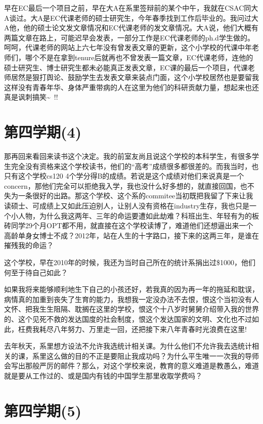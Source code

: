 \documentclass[12pt]{book}
\begin{document}
早在EC最后一个项目之前，早在大A在系里签辩前的某个中午，我就在CSAC同大A谈过。大A是EC代课老师的硕士研究生，今年春季找到工作后毕业的。我问过大A他，他的硕士论文发文章情况和EC代课老师的发文章情况。大A说，他们大概有两篇文章在路上，可能迟早会发表，一部分工作是EC代课老师的ph.d学生做的。呵呵，代课老师的网站上六七年没有曾发表文章的更新，这个小学校的代课中年老师们，哪个不是在拿到tenure后就再也不曾发表一篇文章，EC代课老师，连他的硕士研究生、博士研究生都未必能真正发表文章，EC课的最后一个项目，代课老师居然是狠打舆论、鼓励学生去发表文章来装点门面，这个小学校居然也是要留我这样没有青春年华、身体严重带病的人在这里为他们的科研贡献力量，想起来也还真是讽刺搞笑\textasciitilde{}~!!

\section{第四学期(4)}
\label{sec-45-4}

那再回来看回来读书这个决定。我的前室友尚且说这个学校的本科学生，有很多学生完全没有资格来这个学校读书，他们的“高考”成绩很多都很差的。而我当时，也只有这个学校cs120 4个学分得B的成绩。若说是这个成绩对他们来说真是一个concern，那他们完全可以拒绝我入学，我也没什么好多想的，就直接回国，也不失为一条很好的出路。那这个学校、这个系的commitee当初既把我留了下来让我读硕士、可成绩上又如此压迫别人，让别人没有资格在industry生存，我也只是一个小人物，为什么我这两年、三年的命运要遭如此劫难？科班出生、年轻有为的板砖同学29个月OPT都不用，就直接在这个学校读博了，难道他们还想逼出来一个高龄单身女博士不成？2012年，站在人生的十字路口，接下来的这两三年，是谁在摧残我的命运？

这个学校，早在2010年的时候，我还为当时自己所在的统计系捐出过\$1000，他们何至于待自己如此？

如果我将来能够顺利地生下自己的小孩还好，若我真的因为再一年的拖延和耽误，病情真的加重到丧失了生育的能力，我想我一定没办法不去恨，恨这个当初没有人文怀、把我生生阻隔、耽搁在这里的学校，恨这个十八岁时舅舅介绍带入我的世界的、这个见死不救的发达国度的社会制度，恨这个发达国家的文明、文化也不过如此，枉费我耗尽八年努力、万里走一回，还把接下来八年青春时光浪费在这里!

去年秋天，系里想方设法不允许我选统计相关课。为什么他们不允许我去选统计相关的课，系里这么做的目的不正是要阻止我成功吗？为什么平生唯一一次我的导师会写出那般严厉的邮件？那么，对这个学校来说，教育的意义难道是教愚么，难道就是要从工作过的、或是国内有钱的中国学生那里收取学费吗？

\section{第四学期(5)}
\label{sec-45-5}
\end{document}
